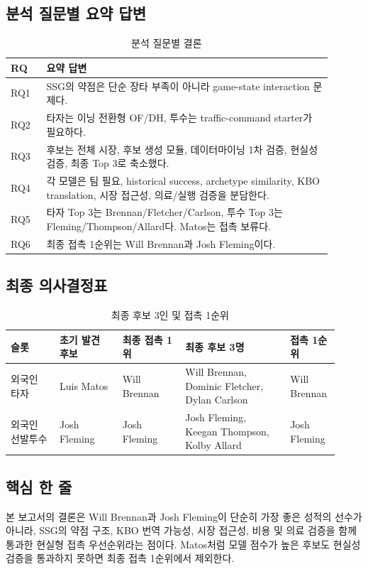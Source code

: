 \documentclass[11pt,a4paper]{article}
\begin{document}
\subsection{분석 질문별 요약 답변}
\begin{table}[H]
\centering
\caption{분석 질문별 결론}
\label{tab:rq_answers}
\small
\begin{tabularx}{\linewidth}{C{0.10\linewidth}L{0.80\linewidth}}
\toprule
RQ & 요약 답변 \\
\midrule
RQ1 & SSG의 약점은 단순 장타 부족이 아니라 game-state interaction 문제다. \\
RQ2 & 타자는 이닝 전환형 OF/DH, 투수는 traffic-command starter가 필요하다. \\
RQ3 & 후보는 전체 시장, 후보 생성 모듈, 데이터마이닝 1차 검증, 현실성 검증, 최종 Top 3로 축소했다. \\
RQ4 & 각 모델은 팀 필요, historical success, archetype similarity, KBO translation, 시장 접근성, 의료/실행 검증을 분담한다. \\
RQ5 & 타자 Top 3는 Brennan/Fletcher/Carlson, 투수 Top 3는 Fleming/Thompson/Allard다. Matos는 접촉 보류다. \\
RQ6 & 최종 접촉 1순위는 Will Brennan과 Josh Fleming이다. \\
\bottomrule
\end{tabularx}
\end{table}

\subsection{최종 의사결정표}
\begin{table}[H]
\centering
\caption{최종 후보 3인 및 접촉 1순위}
\label{tab:final_decision}
\small
\begin{tabularx}{\linewidth}{L{0.14\linewidth}L{0.18\linewidth}L{0.18\linewidth}L{0.30\linewidth}L{0.12\linewidth}}
\toprule
슬롯 & 초기 발견 후보 & 최종 접촉 1위 & 최종 후보 3명 & 접촉 1순위 \\
\midrule
외국인 타자 & Luis Matos & Will Brennan & Will Brennan, Dominic Fletcher, Dylan Carlson & Will Brennan \\
외국인 선발투수 & Josh Fleming & Josh Fleming & Josh Fleming, Keegan Thompson, Kolby Allard & Josh Fleming \\
\bottomrule
\end{tabularx}
\end{table}

\subsection{핵심 한 줄}
본 보고서의 결론은 Will Brennan과 Josh Fleming이 단순히 가장 좋은 성적의 선수가 아니라, SSG의 약점 구조, KBO 번역 가능성, 시장 접근성, 비용 및 의료 검증을 함께 통과한 현실형 접촉 우선순위라는 점이다. Matos처럼 모델 점수가 높은 후보도 현실성 검증을 통과하지 못하면 최종 접촉 1순위에서 제외한다.
\end{document}
